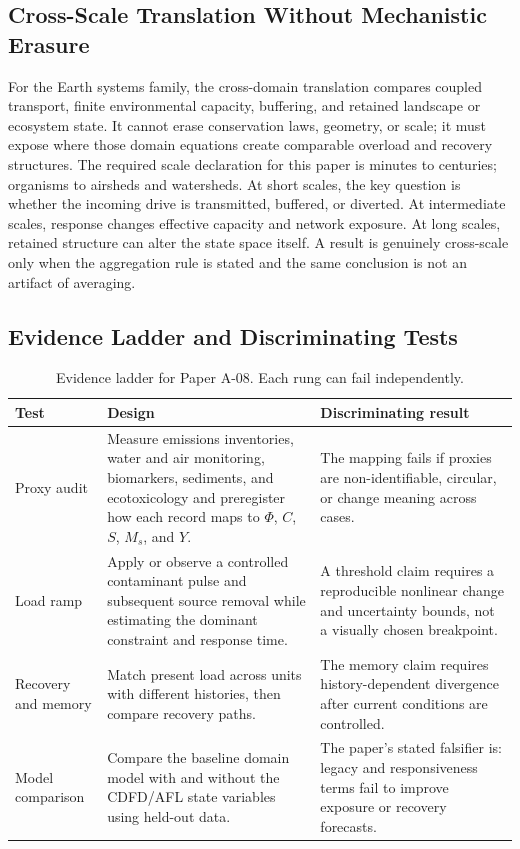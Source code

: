 \documentclass[11pt,a4paper]{article}
\begin{document}
\subsection{Cross-Scale Translation Without Mechanistic Erasure}

For the Earth systems family, the cross-domain translation compares coupled transport, finite environmental capacity, buffering, and retained landscape or ecosystem state. It cannot erase conservation laws, geometry, or scale; it must expose where those domain equations create comparable overload and recovery structures. \cite{Holling1973,Turing1952,BakTangWiesenfeld1987}
The required scale declaration for this paper is minutes to centuries; organisms to airsheds and watersheds. At short
scales, the key question is whether the incoming drive is transmitted,
buffered, or diverted. At intermediate scales, response changes effective
capacity and network exposure. At long scales, retained structure can alter the
state space itself. A result is genuinely cross-scale only when the aggregation
rule is stated and the same conclusion is not an artifact of averaging.

\subsection{Evidence Ladder and Discriminating Tests}

\begin{table}[htbp]
\centering
\small
\caption{Evidence ladder for Paper A-08. Each rung can fail independently.}
\begin{tabularx}{\textwidth}{|p{}|X|X|}
\hline
\textbf{Test} & \textbf{Design} & \textbf{Discriminating result} \\
\hline
Proxy audit & Measure emissions inventories, water and air monitoring, biomarkers, sediments, and ecotoxicology and preregister how each record maps to $\Phi$, $C$, $S$, $M_s$, and $Y$. & The mapping fails if proxies are non-identifiable, circular, or change meaning across cases. \\
\hline
Load ramp & Apply or observe a controlled contaminant pulse and subsequent source removal while estimating the dominant constraint and response time. & A threshold claim requires a reproducible nonlinear change and uncertainty bounds, not a visually chosen breakpoint. \\
\hline
Recovery and memory & Match present load across units with different histories, then compare recovery paths. & The memory claim requires history-dependent divergence after current conditions are controlled. \\
\hline
Model comparison & Compare the baseline domain model with and without the CDFD/AFL state variables using held-out data. & The paper's stated falsifier is: legacy and responsiveness terms fail to improve exposure or recovery forecasts. \\
\hline
\end{tabularx}
\end{table}
\end{document}
